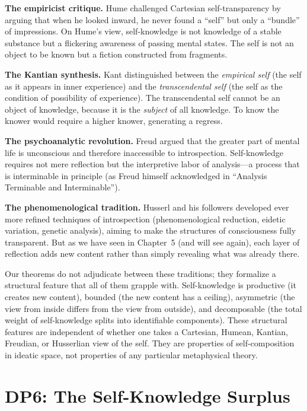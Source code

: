 \textbf{The empiricist critique.} Hume challenged Cartesian
self-transparency by arguing that when he looked inward, he never found
a ``self'' but only a ``bundle'' of impressions. On Hume's view,
self-knowledge is not knowledge of a stable substance but a flickering
awareness of passing mental states. The self is not an object to be
known but a fiction constructed from fragments.

\textbf{The Kantian synthesis.} Kant distinguished between the
\emph{empirical self} (the self as it appears in inner experience) and
the \emph{transcendental self} (the self as the condition of
possibility of experience). The transcendental self cannot be an object
of knowledge, because it is the \emph{subject} of all knowledge. To
know the knower would require a higher knower, generating a regress.

\textbf{The psychoanalytic revolution.} Freud argued that the greater
part of mental life is unconscious and therefore inaccessible to
introspection. Self-knowledge requires not mere reflection but the
interpretive labor of analysis---a process that is interminable in
principle (as Freud himself acknowledged in ``Analysis Terminable and
Interminable'').

\textbf{The phenomenological tradition.} Husserl and his followers
developed ever more refined techniques of introspection
(phenomenological reduction, eidetic variation, genetic analysis),
aiming to make the structures of consciousness fully transparent. But
as we have seen in Chapter~5 (and will see again), each layer of
reflection adds new content rather than simply revealing what was already
there.

Our theorems do not adjudicate between these traditions; they formalize
a structural feature that all of them grapple with. Self-knowledge is
productive (it creates new content), bounded (the new content has a
ceiling), asymmetric (the view from inside differs from the view from
outside), and decomposable (the total weight of self-knowledge splits
into identifiable components). These structural features are independent
of whether one takes a Cartesian, Humean, Kantian, Freudian, or
Husserlian view of the self. They are properties of self-composition
in ideatic space, not properties of any particular metaphysical theory.

\section{DP6: The Self-Knowledge Surplus}


